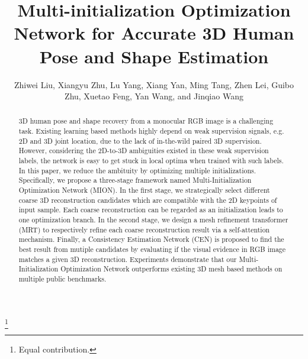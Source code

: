 \documentclass[sigconf]{acmart}
\begin{document}
	\fancyhead{}




\title{Multi-initialization Optimization Network for Accurate 3D Human Pose and Shape Estimation}



\author{Zhiwei Liu, Xiangyu Zhu,  Lu Yang,  Xiang Yan,  Ming Tang, Zhen Lei,  Guibo Zhu,  Xuetao Feng,  Yan Wang, and Jinqiao Wang}
\thanks{Equal contribution.}





\renewcommand{\shortauthors}{Trovato and Tobin, et al.}

\begin{abstract}
	3D human pose and shape recovery from a monocular RGB image is a challenging task. Existing learning based 
	methods highly depend on weak supervision signals, e.g. 2D and 3D joint location, 
	due to the lack of in-the-wild paired 3D supervision. 
	However, considering the 2D-to-3D ambiguities existed 
	in these weak supervision labels, the network is easy to get stuck in local optima when trained with such labels. 
	In this paper, we reduce the ambituity by optimizing multiple initializations. 
	Specifically, we propose a three-stage framework named Multi-Initialization Optimization Network (MION). 
	In the first stage, we strategically select different coarse 3D reconstruction 
	candidates which are compatible with the 2D keypoints of input sample. 
	Each coarse reconstruction can be regarded as an initialization leads to one optimization branch. 
	In the second stage, we design a mesh refinement transformer (MRT) to 
	respectively refine each coarse reconstruction result via a self-attention mechanism. Finally, a Consistency Estimation 
	Network (CEN) is proposed to find the best result from mutiple candidates by evaluating 
	if the visual evidence in RGB image matches a given 3D reconstruction. 
	Experiments demonstrate that our Multi-Initialization Optimization Network 
	outperforms existing 3D mesh based methods on multiple public benchmarks.
	
	
\end{abstract}
\end{document}
